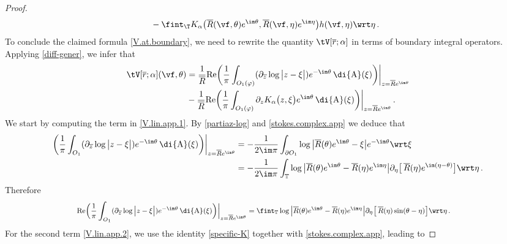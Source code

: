 \documentclass[a4paper,reqno,10pt]{article}
\newcommand{\wrta}{\,\di {\rm A}}
\begin{document}
\begin{proof}
\begin{align*}
	&\  - \fint_{\T} K_{\alpha}\big( \overline R(\vf,\theta)e^{\im\theta}, \overline R(\vf,\eta)e^{\im\eta} \big) h(\vf,\eta) \wrt \eta\,.
\end{align*}
To conclude the claimed formula \eqref{V.at.boundary}, we need to rewrite the quantity \( \tV[\overline r;\alpha]\) in terms of boundary integral operators. 
 Applying \eqref{diff-gener}, we infer that 
\begin{align}
	\tV[\overline r;\alpha](\vf,\theta) &  = \frac{1}{\overline{R}} {\rm Re}\bigg(\frac{1}{\pi}\int_{O_{1}(\varphi)} (\partial_{\overline{z}}\log \big| z -\xi \big|) e^{-\im \theta} \wrta(\xi)\bigg)\bigg|_{z=\overline{R} e^{\im \theta}} \label{V.lin.app.1}\\
	&  -\frac{1}{ \overline{R}} {\rm Re}\bigg(\frac{1}{\pi} \int_{O_{1}(\varphi)} \partial_z K_\alpha \big(z, \xi \big) e^{\im \theta}   \wrta(\xi)\bigg)\bigg|_{z=\overline{R} e^{\im \theta}}  \,.\label{V.lin.app.2}
\end{align}
We start by computing the term in \eqref{V.lin.app.1}. By \eqref{partiaz-log} and \eqref{stokes.complex.app} we deduce that
\begin{align*}
    \bigg(\frac{1}{\pi}\int_{O_{1}} (\partial_{\overline{z}}\log \big| z -\xi \big|) e^{-\im \theta} \wrta(\xi)\bigg)\bigg|_{z=\overline{R} e^{\im \theta}}&=-\frac{1}{2\im \pi}\int_{\partial O_{1}} \log \big| \overline{R}(\theta) e^{\im \theta} -\xi \big| e^{-\im \theta} \wrt \xi\\
    &=-\frac{1}{2\im \pi}\int_{\mathbb{T}} \log \big| \overline{R}(\theta) e^{\im \theta} -\overline{R}(\eta) e^{\im \eta} \big| \partial_\eta\big[\,\overline{R}(\eta) e^{\im (\eta-\theta)}\big] \wrt \eta\,.
\end{align*}
Therefore
\begin{equation} \label{heat1}
    \begin{footnotesize}
        \begin{aligned}
              {\rm Re}\bigg(\frac{1}{\pi}\int_{O_{1}} (\partial_{\overline{z}}\log \big| z -\xi \big|) e^{-\im \theta} \wrta(\xi)\bigg)\bigg|_{z=\overline{R} e^{\im \theta}}
    &=\fint_{\mathbb{T}} \log \big| \overline{R}(\theta) e^{\im \theta} -\overline{R}(\eta) e^{\im \eta} \big| \partial_\eta\big[\,\overline{R}(\eta) \sin (\theta-\eta)\big] \wrt \eta \,. 
        \end{aligned}
    \end{footnotesize}
\end{equation}
For the second term \eqref{V.lin.app.2}, we use the identity \eqref{specific-K} together with \eqref{stokes.complex.app}, leading to

\end{proof}
\end{document}
